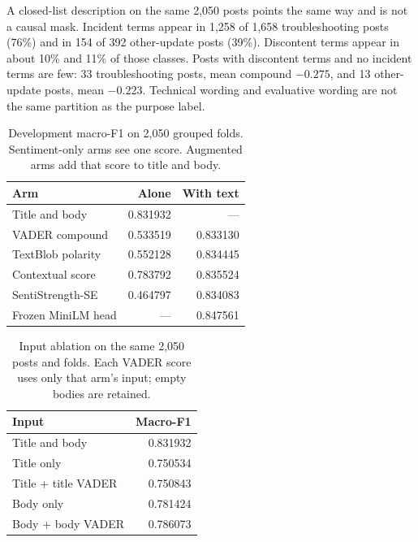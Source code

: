 \documentclass[conference,letterpaper]{IEEEtran}
\begin{document}
A closed-list description on the same 2,050 posts points the same way and is not a causal mask. Incident terms appear in 1,258 of 1,658 troubleshooting posts (76\%) and in 154 of 392 other-update posts (39\%). Discontent terms appear in about 10\% and 11\% of those classes. Posts with discontent terms and no incident terms are few: 33 troubleshooting posts, mean compound $-0.275$, and 13 other-update posts, mean $-0.223$. Technical wording and evaluative wording are not the same partition as the purpose label.

\begin{table}[t]
\caption{Development macro-F1 on 2,050 grouped folds. Sentiment-only arms see one score. Augmented arms add that score to title and body.}
\label{tab:sent}
\centering
\footnotesize
\setlength{\tabcolsep}{3pt}
\begin{tabular}{lrr}
\toprule
Arm & Alone & With text \\
\midrule
Title and body & 0.831932 & --- \\
VADER compound & 0.533519 & 0.833130 \\
TextBlob polarity & 0.552128 & 0.834445 \\
Contextual score & 0.783792 & 0.835524 \\
SentiStrength-SE & 0.464797 & 0.834083 \\
Frozen MiniLM head & --- & 0.847561 \\
\bottomrule
\end{tabular}
\end{table}

\begin{table}[t]
\caption{Input ablation on the same 2,050 posts and folds. Each VADER score uses only that arm's input; empty bodies are retained.}
\label{tab:ablate}
\centering
\footnotesize
\begin{tabular}{lr}
\toprule
Input & Macro-F1 \\
\midrule
Title and body & 0.831932 \\
Title only & 0.750534 \\
Title + title VADER & 0.750843 \\
Body only & 0.781424 \\
Body + body VADER & 0.786073 \\
\bottomrule
\end{tabular}
\end{table}
\end{document}
